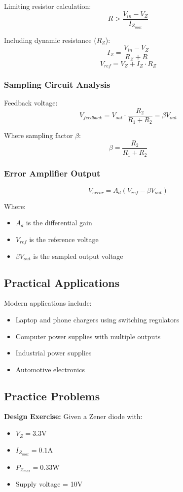 \documentclass[a4paper,9pt,twoside,openany,twocolumn]{memoir}
\begin{document}
Limiting resistor calculation:
\[ R > \frac{V_{in} - V_Z}{I_{Z_{max}}} \]

Including dynamic resistance ($R_Z$):
\[ I_Z = \frac{V_{in} - V_Z}{R_Z + R} \]
\[ V_{ref} = V_Z + I_Z \cdot R_Z \]

\subsubsection{Sampling Circuit Analysis}
Feedback voltage:
\[ V_{feedback} = V_{out} \cdot \frac{R_2}{R_1 + R_2} = \beta V_{out} \]

Where sampling factor $\beta$:
\[ \beta = \frac{R_2}{R_1 + R_2} \]

\subsubsection{Error Amplifier Output}
\[ V_{error} = A_d(V_{ref} - \beta V_{out}) \]

Where:
\begin{itemize}
    \item $A_d$ is the differential gain
    \item $V_{ref}$ is the reference voltage
    \item $\beta V_{out}$ is the sampled output voltage
\end{itemize}

\subsection{Practical Applications}
Modern applications include:
\begin{itemize}
    \item Laptop and phone chargers using switching regulators
    \item Computer power supplies with multiple outputs
    \item Industrial power supplies
    \item Automotive electronics
\end{itemize}

\subsection{Practice Problems}
\textbf{Design Exercise:} Given a Zener diode with:
\begin{itemize}
    \item $V_Z = 3.3$V
    \item $I_{Z_{max}} = 0.1$A
    \item $P_{Z_{max}} = 0.33$W
    \item Supply voltage = 10V
\end{itemize}
\end{document}
